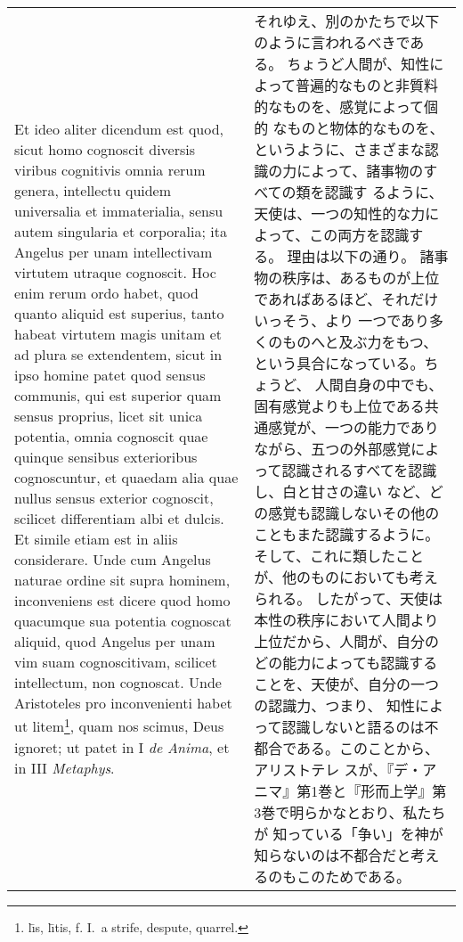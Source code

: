 \documentclass[10pt]{jsarticle} %
\begin{document}
\begin{longtable}{p{21em}p{21em}}
Et ideo aliter dicendum est
quod, sicut homo cognoscit diversis viribus cognitivis omnia rerum
genera, intellectu quidem universalia et immaterialia, sensu autem
singularia et corporalia; ita Angelus per unam intellectivam virtutem
utraque cognoscit. Hoc enim rerum ordo habet, quod quanto aliquid est
superius, tanto habeat virtutem magis unitam et ad plura se extendentem,
sicut in ipso homine patet quod sensus communis, qui est superior quam
sensus proprius, licet sit unica potentia, omnia cognoscit quae quinque
sensibus exterioribus cognoscuntur, et quaedam alia quae nullus sensus
exterior cognoscit, scilicet differentiam albi et dulcis. Et simile
etiam est in aliis considerare. Unde cum Angelus naturae ordine sit
supra hominem, inconveniens est dicere quod homo quacumque sua potentia
cognoscat aliquid, quod Angelus per unam vim suam cognoscitivam,
scilicet intellectum, non cognoscat. Unde Aristoteles pro inconvenienti
habet ut litem\footnote{l\={\i}s, l\={\i}tis, f. I.~a strife, despute, quarrel.}, quam nos scimus, Deus ignoret; ut patet in I {\itshape de Anima},
et in III {\itshape Metaphys}. 


&

 それゆえ、別のかたちで以下のように言われるべきである。
 ちょうど人間が、知性によって普遍的なものと非質料的なものを、感覚によって個的
 なものと物体的なものを、というように、さまざまな認識の力によって、諸事物のすべての類を認識す
 るように、天使は、一つの知性的な力によって、この両方を認識する。
 理由は以下の通り。
 諸事物の秩序は、あるものが上位であればあるほど、それだけいっそう、より
 一つであり多くのものへと及ぶ力をもつ、という具合になっている。ちょうど、
 人間自身の中でも、固有感覚よりも上位である共通感覚が、一つの能力であり
 ながら、五つの外部感覚によって認識されるすべてを認識し、白と甘さの違い
 など、どの感覚も認識しないその他のこともまた認識するように。
 そして、これに類したことが、他のものにおいても考えられる。
 したがって、天使は本性の秩序において人間より上位だから、人間が、自分の
 どの能力によっても認識することを、天使が、自分の一つの認識力、つまり、
知性によって認識しないと語るのは不都合である。このことから、アリストテレ
 スが、『デ・アニマ』第1巻と『形而上学』第3巻で明らかなとおり、私たちが
 知っている「争い」を神が知らないのは不都合だと考えるのもこのためである。
 

\\


\end{longtable}
\end{document}
